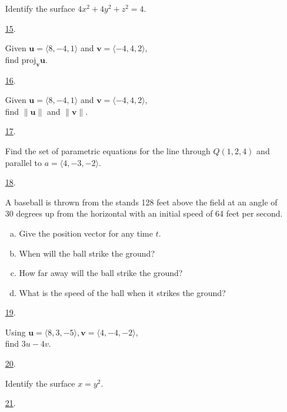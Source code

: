 \documentclass[fleqn]{article}
\renewcommand{\vec}[1]{\mathbf{#1}}
\begin{document}
\begin{itemize}
Identify the surface \(4x^2+4y^2+z^2=4\).
\smallskip

\item[\hyperlink{15-answer}{15}.]\hypertarget{15-problem}{}

Given $\vec u=\langle 8,-4,1\rangle$ and $\vec v=\langle -4,4,2\rangle$,\\
find $\text{proj}_{\vec v}\vec u$.
\smallskip

\item[\hyperlink{16-answer}{16}.]\hypertarget{16-problem}{}

Given $\vec u=\langle 8,-4,1\rangle$ and $\vec v=\langle -4,4,2\rangle$,\\
find $\|\vec u\|$ and $\|\vec v\|$.
\smallskip

\item[\hyperlink{17-answer}{17}.]\hypertarget{17-problem}{}

Find the set of parametric equations for the line through $Q(1,2,4)$ and
parallel to $a=\langle 4,-3,-2\rangle$.
\smallskip

\item[\hyperlink{18-answer}{18}.]\hypertarget{18-problem}{}

A baseball is thrown from the stands 128 feet above the field at an angle of
30 degrees up from the horizontal with an initial speed of 64 feet per second.
\begin{enumerate}[a.]
  \item Give the position vector for any time \(t\).
  \item When will the ball strike the ground?
  \item How far away will the ball strike the ground?
  \item What is the speed of the ball when it strikes the ground?
\end{enumerate}
\smallskip

\item[\hyperlink{19-answer}{19}.]\hypertarget{19-problem}{}

Using $\mathbf u=\langle 8,3,-5\rangle,\mathbf v=\langle 4,-4,-2\rangle$,\\
find $3u-4v$.
\smallskip

\item[\hyperlink{20-answer}{20}.]\hypertarget{20-problem}{}

Identify the surface \(x=y^2\).
\smallskip

\item[\hyperlink{21-answer}{21}.]\hypertarget{21-problem}{}


\end{itemize}
\end{document}
